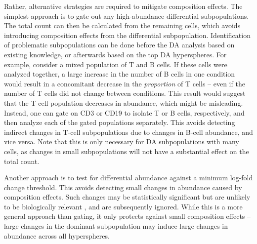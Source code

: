 \documentclass{article}
\begin{document}
Rather, alternative strategies are required to mitigate composition effects.
The simplest approach is to gate out any high-abundance differential subpopulations.
The total count can then be calculated from the remaining cells, which avoids introducing composition effects from the differential subpopulation.
Identification of problematic subpopulations can be done before the DA analysis based on existing knowledge, or afterwards based on the top DA hyperspheres.
For example, consider a mixed population of T and B cells.
    If these cells were analyzed together, a large increase in the number of B cells in one condition would result in a concomitant decrease in the \textit{proportion} of T cells -- even if the number of T cells did not change between conditions.
    This result would suggest that the T cell population decreases in abundance, which might be misleading.
Instead, one can gate on CD3 or CD19 to isolate T or B cells, respectively, and then analyze each of the gated populations separately.
This avoids detecting indirect changes in T-cell subpopulations due to changes in B-cell abundance, and vice versa.
Note that this is only necessary for DA subpopulations with many cells, as changes in small subpopulations will not have a substantial effect on the total count.

Another approach is to test for differential abundance against a minimum log-fold change threshold.
This avoids detecting small changes in abundance caused by composition effects.
Such changes may be statistically significant but are unlikely to be biologically relevant \cite{mccarthy2009treat}, and are subsequently ignored.
While this is a more general approach than gating, it only protects against small composition effects -- large changes in the dominant subpopulation may induce large changes in abundance across all hyperspheres.
\end{document}
